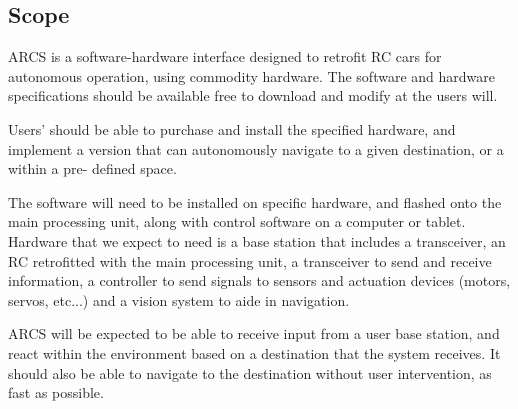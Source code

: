 \documentclass[compsoc,draftclsnofoot,onecolumn,10pt]{IEEEtran}
\begin{document}
\subsection{Scope} %
ARCS is a software-hardware interface designed to retrofit RC cars for autonomous 
operation, using commodity hardware. The software and hardware specifications 
should be available free to download and modify at the users will. \par
Users' should be able to purchase and install the specified hardware, and implement a 
version that can autonomously navigate to a given destination, or a within a pre-
defined space.  \par
The software will need to be installed on specific hardware, and flashed onto the 
main processing unit, along with control software on a computer or tablet. Hardware 
that we expect to need is a base station that includes a transceiver, an RC retrofitted 
with the main processing unit, a transceiver to send and receive information, a 
controller to send signals to sensors and actuation devices (motors, servos, etc...) and
a vision system to aide in navigation. \par
ARCS will be expected to be able to receive input from a user base station, and react
within the environment based on a destination that the system receives. It should also
be able to navigate to the destination without user intervention, as fast as possible. \par
\end{document}
